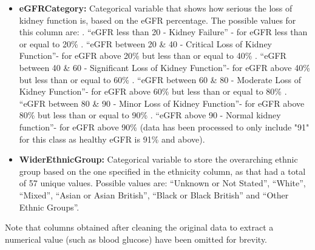 {\begin{itemize}
        \item \textbf{eGFR\textunderscore Category:} Categorical variable that shows how serious the loss of kidney function is, based on the eGFR percentage. The possible values for this column are: . ``eGFR less than 20 - Kidney Failure'' - for eGFR less than or equal to 20\% . ``eGFR between 20 \& 40 - Critical Loss of Kidney Function''- for eGFR above 20\% but less than or equal to 40\% . ``eGFR between 40 \& 60 - Significant Loss of Kidney Function''- for eGFR above 40\% but less than or equal to 60\% . ``eGFR between 60 \& 80 - Moderate Loss of Kidney Function''- for eGFR above 60\% but less than or equal to 80\% . ``eGFR between 80 \& 90 - Minor Loss of Kidney Function''- for eGFR above 80\% but less than or equal to 90\% . ``eGFR above 90 - Normal kidney function''- for eGFR above 90\% (data has been processed to only include "91" for this class as healthy eGFR is 91\% and above). \newline

        \item \textbf{Wider\textunderscore Ethnic\textunderscore Group:} Categorical variable to store the overarching ethnic group based on the one specified in the ethnicity column, as that had a total of 57 unique values. Possible values are: ``Unknown or Not Stated'', ``White'', ``Mixed'', ``Asian or Asian British'', ``Black or Black British'' and ``Other Ethnic Groups''.

    \end{itemize}

    \vspace{10pt}
    \noindent Note that columns obtained after cleaning the original data to extract a numerical value (such as blood glucose) have been omitted for brevity.

}


